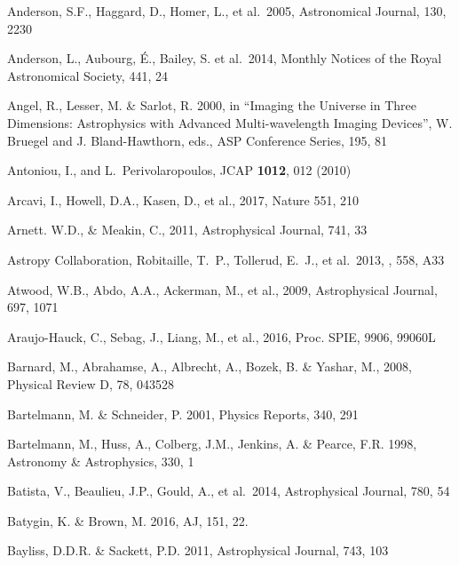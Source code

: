 \documentclass[twocolumn]{aastex61}
\begin{document}
\begin{thebibliography}{}
 Anderson, S.F., Haggard, D., Homer, L., et al.~2005, Astronomical Journal, 130, 2230

 Anderson, L., Aubourg, \'E., Bailey, S. et al.~2014,
  Monthly Notices of the Royal Astronomical Society, 441, 24

 Angel, R., Lesser, M. \& Sarlot, R. 2000, in  ``Imaging the Universe in Three Dimensions: Astrophysics with Advanced Multi-wavelength Imaging Devices'', W. Bruegel and J. Bland-Hawthorn, eds., ASP Conference Series, 195, 81

 Antoniou, I., and L.~Perivolaropoulos, JCAP {\bf 1012}, 012 (2010)

 Arcavi, I., Howell, D.A., Kasen, D., et al., 2017, Nature 551, 210

 Arnett. W.D., \& Meakin, C., 2011, Astrophysical Journal, 741, 33

 Astropy Collaboration, Robitaille, T.~P., Tollerud, E.~J., et al.\ 2013, \aap, 558, A33

 Atwood, W.B., Abdo, A.A., Ackerman, M., et al., 2009, Astrophysical Journal, 697, 1071

 Araujo-Hauck, C., Sebag, J., Liang, M., et al., 2016,  Proc. SPIE, 9906, 99060L

 Barnard, M., Abrahamse, A., Albrecht, A., Bozek, B. \& Yashar, M., 2008, Physical Review D, 78, 043528

 Bartelmann, M. \& Schneider, P. 2001, Physics Reports, 340, 291

 Bartelmann, M., Huss, A., Colberg, J.M., Jenkins, A. \& Pearce, F.R. 1998, Astronomy \& Astrophysics, 330, 1

 Batista, V., Beaulieu, J.P., Gould, A., et al.~2014, Astrophysical Journal, 780, 54

 Batygin, K. \& Brown, M. 2016, AJ, 151, 22.

 Bayliss, D.D.R. \& Sackett, P.D. 2011, Astrophysical Journal, 743, 103


\end{thebibliography}
\end{document}
